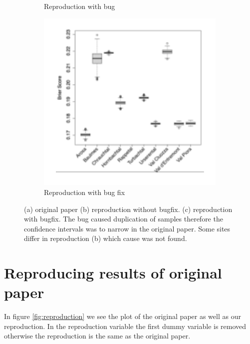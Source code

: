 \documentclass[twoside,twocolumn]{article}
\begin{document}
\begin{figure}
\begin{subfigure}{.33\textwidth}
      \caption{Reproduction with bug}
      \label{fig:bug_fix:2}
    \end{subfigure}%
    \begin{subfigure}{.33\textwidth}
      \centering
      \includegraphics[width=\linewidth]{repr_brierscore}
      \caption{Reproduction with bug fix}
      \label{fig:bug_fix:3}
    \end{subfigure}
    \caption{(a) original paper (b) reproduction without bugfix. (c) reproduction with bugfix. \newline The bug caused duplication of samples therefore the confidence intervals was to narrow in the original paper. Some sites differ in reproduction (b) which cause was not found. }
    \label{fig:bug_fix}
\end{figure}

\section{Reproducing results of original paper}

In figure \ref{fig:reproduction} we see the plot of the original paper as well as our reproduction.
In the reproduction variable the first dummy variable is removed otherwise the reproduction is the same as the original paper.
\end{document}
